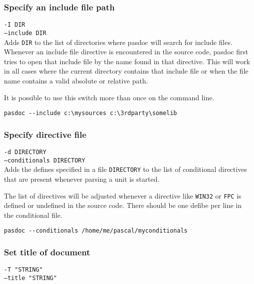 \documentclass[11pt]{article}
\begin{document}
\subsubsection{Specify an include file path}
\label{specifyincludefilepath}

{\tt -I DIR}\\
{\tt --include DIR}\\

Adds {\tt DIR} to the list of directories where pasdoc will search for include
files.
Whenever an include file directive is encountered in the source code, pasdoc
first tries to open that include file by the name found in that directive.
This will work in all cases where the current directory contains that include
file or when the file name contains a valid absolute or relative path.

It is possible to use this switch more than once on the command line.

\begin{verbatim}
pasdoc --include c:\mysources c:\3rdparty\somelib
\end{verbatim}

\subsubsection{Specify directive file}
\label{specifydirectives}

{\tt -d DIRECTORY}\\
{\tt --conditionals DIRECTORY}\\

Adds the defines specified in a file {\tt DIRECTORY} to the list of conditional directives 
that are present whenever parsing a unit is started.

The list of directives will be adjusted whenever a directive like {\tt WIN32}
or {\tt FPC} is defined or undefined in the source code. There should be one
defibe per line in the conditional file. 

\begin{verbatim}
pasdoc --conditionals /home/me/pascal/myconditionals
\end{verbatim}

\subsubsection{Set title of document}

{\tt -T "STRING"}\\
{\tt --title "STRING"}\\
\end{document}
